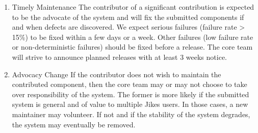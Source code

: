 \begin{enumerate}
\item{Timely Maintenance}  
The contributor of a significant contribution is expected to be the
advocate of the system and will fix the submitted components if and
when defects are discovered.  We expect serious failures (failure rate
> 15\%) to be fixed within a few days or a week.  Other failures (low
failure rate or non-deterministic failures) should be fixed before a
release.  The core team will strive to announce planned releases with
at least 3 weeks notice.

\item{Advocacy Change}  
If the contributor does not wish to maintain the contributed
component, then the core team may or may not choose to take over
responsibility of the system.  The former is more likely if the
submitted system is general and of value to multiple Jikes users.  
In those cases, a new maintainer may volunteer.  If not and if the
stability of the system degrades, the system may eventually be
removed.

\end{enumerate}
